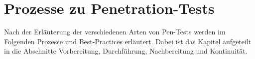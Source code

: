\chapter{Prozesse zu Penetration-Tests}\label{ref:prozpentest}
Nach der Erläuterung der verschiedenen Arten von Pen-Tests werden im Folgenden Prozesse und Best-Practices erläutert. Dabei ist das Kapitel aufgeteilt in die Abschnitte Vorbereitung, Durchführung, Nachbereitung und Kontinuität.




